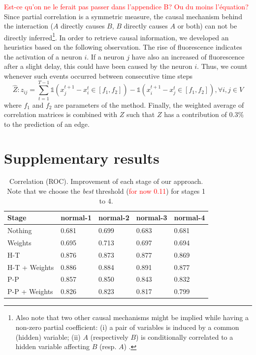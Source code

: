 \documentclass[wcp]{jmlr}
\begin{document}
\textcolor{red}{Est-ce qu'on ne le ferait pas passer dans l'appendice B? Ou du moins l'équation?}
Since partial correlation is a symmetric measure, the causal mechanism behind the
interaction ($A$ directly causes $B$, $B$ directly causes $A$ or both) can not
be directly inferred\footnote{Also note that two other causal mechanisms might be
implied while having a non-zero partial coefficient: (i) a pair of variables
is induced by a common (hidden) variable; (ii) $A$ (respectively $B$) is
conditionally correlated to a hidden variable affecting $B$ (resp. $A$)
\citep{de2004discovery}.}.
In order to retrieve causal information, we developed an
heuristics based on the following observation. The rise of fluorescence
indicates the activation of a neuron $i$. If a neuron $j$ have also
an increased of fluorescence after a slight delay, this could have been
caused by the neuron $i$. Thus, we count whenever
such events occurred between consecutive time steps
\[
\hat{Z}: z_{ij} = \sum_{t=1}^{T - 1}
    \mathbb{1}(x_j^{t+1} - x_i^t \in \left[f_1, f_2 \right]) -
    \mathbb{1}(x_i^{t+1} - x_j^t \in \left[f_1, f_2 \right]), \forall i, j \in V
\]
where $f_1$ and $f_2$ are parameters of the method.
Finally, the weighted average of correlation matrices is combined with $Z$ such
that $Z$ has a contribution of $0.3\%$ to the prediction of an edge.

\section{Supplementary results}

\begin{table}[htbp]
\centering
\caption{Correlation (ROC). Improvement of each stage of our approach. Note that we choose the
         \textit{best} threshold (\textcolor{red}{for now 0.11}) for stages 1 to 4.}
\begin{tabular}{*{5}{l}}
\toprule
Stage               & normal-1 & normal-2 & normal-3 & normal-4 \\
\midrule
Nothing             & 0.681 & 0.699 & 0.683 & 0.681\\
Weights             & 0.695 & 0.713 & 0.697 & 0.694\\
H-T                 & 0.876 & 0.873 & 0.877 & 0.869\\
H-T + Weights       & 0.886 & 0.884 & 0.891 & 0.877\\
P-P                 & 0.857 & 0.850 & 0.843 & 0.832\\
P-P + Weights       & 0.826 & 0.823 & 0.817 & 0.799\\
\bottomrule
\end{tabular}
\end{table}
\end{document}

